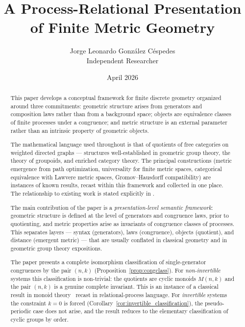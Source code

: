 \documentclass{article}
\title{A Process-Relational Presentation of Finite Metric Geometry}
\author{Jorge Leonardo Gonz\'alez C\'espedes\\
\small Independent Researcher}
\date{April 2026}
\theoremstyle{definition}
\theoremstyle{remark}
\begin{document}
\maketitle

\begin{abstract}
This paper develops a conceptual framework for finite discrete
geometry organized around three commitments: geometric structure
arises from generators and composition laws rather than from a
background space; objects are equivalence classes of finite
processes under a congruence; and metric structure is an external
parameter rather than an intrinsic property of geometric objects.

The mathematical language used throughout is that of quotients
of free categories on weighted directed graphs --- structures
well-established in geometric group theory, the theory of
groupoids, and enriched category theory. The principal
constructions (metric emergence from path optimization, universality
for finite metric spaces, categorical equivalence with Lawvere
metric spaces, Gromov--Hausdorff compatibility) are instances of
known results, recast within this framework and collected in one
place. The relationship to existing work is stated explicitly in
.

The main contribution of the paper is a \emph{presentation-level
semantic framework}: geometric structure is defined at the level
of generators and congruence laws, prior to quotienting, and
metric properties arise as invariants of congruence classes of
processes. This separates layers --- syntax (generators), laws
(congruence), objects (quotient), and distance (emergent metric)
--- that are usually conflated in classical geometry and in
geometric group theory expositions.

The paper presents a complete isomorphism classification of
single-generator congruences by the pair $(n, k)$
(Proposition~\ref{prop:congclass}). For \emph{non-invertible}
systems this classification is non-trivial: the quotients are
cyclic monoids $M(n,k)$ and the pair $(n,k)$ is a genuine
complete invariant. This is an instance of a classical result in
monoid theory~\cite{cliffordpreston} recast in relational-process
language. For \emph{invertible} systems the constraint $k = 0$
is forced (Corollary~\ref{cor:invertible_classification}), the
pseudo-periodic case does not arise, and the result reduces to
the elementary classification of cyclic groups by order.


\end{abstract}
\end{document}
